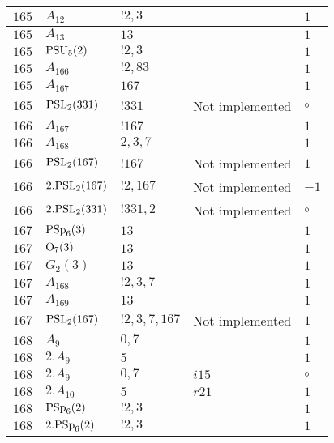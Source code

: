 \documentclass[a4paper, 11pt]{article}
\begin{document}
\begin{longtable}{lllll}
        $ 165 $ & $ A_{12} $ & $ ! 2,3 $ & $ ~ $ & $ 1$ \\ \hline
        $ 165 $ & $ A_{13} $ & $ 13 $ & $ ~ $ & $ 1$ \\ \hline
        $ 165 $ & $ {\rm PSU}_{5}(2) $ & $ ! 2,3 $ & $ ~ $ & $ 1$ \\ \hline
        $ 165 $ & $ A_{166} $ & $ !2, 83 $ & $ ~ $ & $ 1$ \\ \hline
        $ 165 $ & $ A_{167} $ & $ 167 $ & $ ~ $ & $ 1$ \\ \hline
        $ 165 $ & $ {\rm PSL}_{2}(331) $ & $ !331 $ &  Not implemented &  $\circ$ \\ \hline
        $ 166 $ & $ A_{167} $ & $ !167 $ & $ ~ $ & $ 1$ \\ \hline
        $ 166 $ & $ A_{168} $ & $ 2, 3, 7 $ & $ ~ $ & $ 1$ \\ \hline
        $ 166 $ & $ {\rm PSL}_{2}(167) $ & $ !167 $ &  Not implemented & $ 1$ \\ \hline
        $ 166 $ & $ 2.{\rm PSL}_{2}(167) $ & $ !2, 167 $ &  Not implemented & $ -1$ \\ \hline
        $ 166 $ & $ 2.{\rm PSL}_{2}(331) $ & $ !331, 2 $ &  Not implemented &  $\circ$ \\ \hline
        $ 167 $ & $ {\rm PSp}_{6}(3) $ & $ 13 $ & $ ~ $ & $ 1$ \\ \hline
        $ 167 $ & $ {\rm O}_{7}(3) $ & $ 13 $ & $ ~ $ & $ 1$ \\ \hline
        $ 167 $ & $ G_{2}(3) $ & $ 13 $ & $ ~ $ & $ 1$ \\ \hline
        $ 167 $ & $ A_{168} $ & $ !2, 3, 7 $ & $ ~ $ & $ 1$ \\ \hline
        $ 167 $ & $ A_{169} $ & $ 13 $ & $ ~ $ & $ 1$ \\ \hline
        $ 167 $ & $ {\rm PSL}_{2}(167) $ & $ !2, 3, 7, 167 $ &  Not implemented & $ 1$ \\ \hline
        $ 168 $ & $ A_{9} $ & $ 0,7 $ & $ ~ $ & $ 1$ \\ \hline
        $ 168 $ & $ 2.A_{9} $ & $ 5 $ & $ ~ $ & $ 1$ \\ \hline
        $ 168 $ & $ 2.A_{9} $ & $ 0,7 $ & $ i15 $ &  $\circ$ \\ \hline
        $ 168 $ & $ 2.A_{10} $ & $ 5 $ & $ r21 $ & $ 1$ \\ \hline
        $ 168 $ & $ {\rm PSp}_{6}(2) $ & $ ! 2,3 $ & $ ~ $ & $ 1$ \\ \hline
        $ 168 $ & $ 2.{\rm PSp}_{6}(2) $ & $ ! 2,3 $ & $ ~ $ & $ 1$ \\ \hline

\end{longtable}
\end{document}
